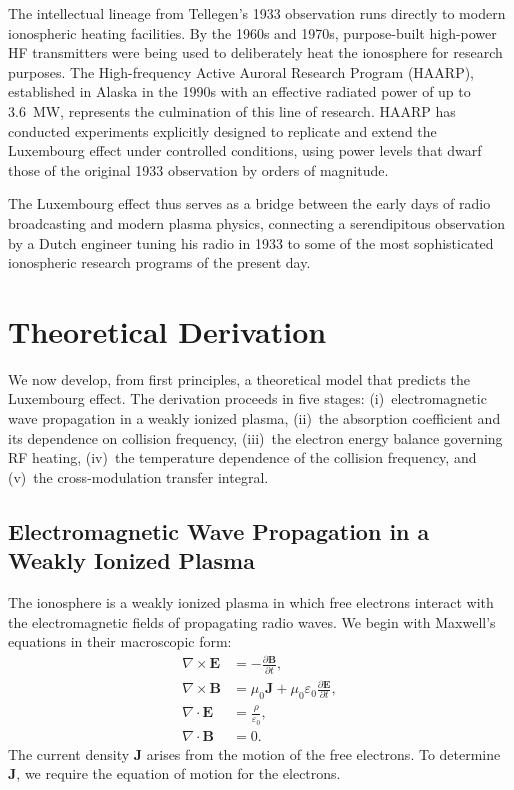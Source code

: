\documentclass[12pt]{article}
\begin{document}
The intellectual lineage from Tellegen's 1933 observation runs directly to modern
ionospheric heating facilities.  By the 1960s and 1970s, purpose-built high-power HF
transmitters were being used to deliberately heat the ionosphere for research purposes.
The High-frequency Active Auroral Research Program (HAARP), established in Alaska in the
1990s with an effective radiated power of up to 3.6~MW, represents the culmination of this
line of research.  HAARP has conducted experiments explicitly designed to replicate and
extend the Luxembourg effect under controlled conditions, using power levels that dwarf
those of the original 1933 observation by orders of magnitude.

The Luxembourg effect thus serves as a bridge between the early days of radio broadcasting
and modern plasma physics, connecting a serendipitous observation by a Dutch engineer
tuning his radio in 1933 to some of the most sophisticated ionospheric research programs of
the present day.

\section{Theoretical Derivation}
\label{sec:theory}

We now develop, from first principles, a theoretical model that predicts the Luxembourg
effect.  The derivation proceeds in five stages: (i)~electromagnetic wave propagation in a
weakly ionized plasma, (ii)~the absorption coefficient and its dependence on collision
frequency, (iii)~the electron energy balance governing RF heating, (iv)~the
temperature dependence of the collision frequency, and (v)~the cross-modulation transfer
integral.

\subsection{Electromagnetic Wave Propagation in a Weakly Ionized Plasma}
\label{sec:propagation}

The ionosphere is a weakly ionized plasma in which free electrons interact with the
electromagnetic fields of propagating radio waves.  We begin with Maxwell's equations in
their macroscopic form:
\begin{align}
  \nabla \times \mathbf{E} &= -\frac{\partial \mathbf{B}}{\partial t}, \label{eq:faraday}\\[6pt]
  \nabla \times \mathbf{B} &= \mu_0 \mathbf{J} + \mu_0 \varepsilon_0
    \frac{\partial \mathbf{E}}{\partial t}, \label{eq:ampere}\\[6pt]
  \nabla \cdot \mathbf{E} &= \frac{\rho}{\varepsilon_0}, \label{eq:gauss}\\[6pt]
  \nabla \cdot \mathbf{B} &= 0. \label{eq:gaussB}
\end{align}
The current density $\mathbf{J}$ arises from the motion of the free electrons.  To
determine $\mathbf{J}$, we require the equation of motion for the electrons.
\end{document}

